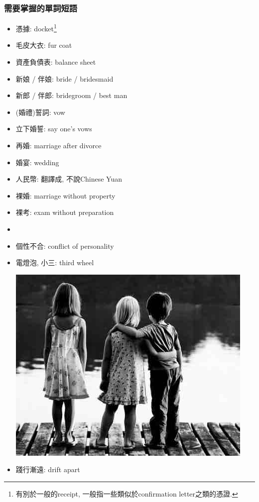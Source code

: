 \subsubsection*{需要掌握的單詞短語}
\begin{multicols}{2}
\begin{itemize}
  \itemsep0em
  \item 憑據: docket\footnote{有別於一般的receipt, 一般指一些類似於confirmation letter之類的憑證.}
  \item 毛皮大衣: fur coat
  \item 資產負債表: balance sheet
  \item 新娘 / 伴娘: bride / bridesmaid
  \item 新郎 / 伴郎: bridegroom / best man
  \item (婚禮)誓詞: vow
  \item 立下婚誓: say one's vows
  \item 再婚: marriage after divorce
  \item 婚宴: wedding 
  \item 人民幣: 翻譯成, 不說Chinese Yuan
  \item 裸婚: marriage without property
  \item 裸考: exam without preparation
  \item {}
  \item 個性不合: conflict of personality
  \item 電燈泡, 小三: third wheel
  \begin{center}
  	\includegraphics[scale=.45]{pics/third-wheel}
  \end{center}
  \item 踐行漸遠: drift apart
\end{itemize}
\end{multicols}

